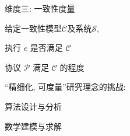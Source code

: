 \begin{frame}{维度三: 一致性度量}
  \begin{center}
	给定一致性模型$\mathcal{C}$及系统$\mathcal{S}$,
  \end{center}

  \pause

  \begin{description}
	\centering
	\setlength{\itemsep}{5pt}
	\item[验证 (verify):] 执行 $e$ 是否满足 $\mathcal{C}$ 
	\item[量化 (quantify):] 协议 $\mathcal{P}$ 满足 $\mathcal{C}$ 的程度
  \end{description}

  \pause
  \vspace{0.50cm}

  \begin{center}
	``精细化, 可度量''研究理念的挑战:
	\vspace{8pt}
	\begin{description}
	  \centering
	  \item[验证:] 算法设计与分析
	  \item[量化:] 数学建模与求解
	\end{description}
  \end{center}
\end{frame}
